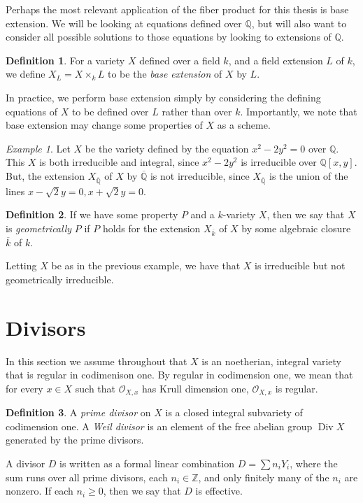 \documentclass[12pt,twoside]{reedthesis}
\theoremstyle{plain}
\theoremstyle{definition}
\newtheorem{definition}{Definition}[section]
\theoremstyle{remark}
\newtheorem{example}{Example}[section]
\newcommand{\ZZ}{\mathbb{Z}}
\newcommand{\QQ}{\mathbb{Q}}
\newcommand{\calO}{\mathcal{O}}
\newcommand{\Div}{\operatorname{Div}}
\begin{document}
Perhaps the most relevant application of the fiber product for this thesis is base extension. We will be looking at equations defined over $\QQ$, but will also want to consider all possible solutions to those equations by looking to extensions of $\QQ$.
\begin{definition}
For a variety $X$ defined over a field $k$, and a field extension $L$ of $k$, we define $X_L=X\times_k L$ to be the \emph{base extension} of $X$ by $L$.
\end{definition}
\noindent In practice, we perform base extension simply by considering the defining equations of $X$ to be defined over $L$ rather than over $k$. Importantly, we note that base extension may change some properties of $X$ as a scheme.

\begin{example}
Let $X$ be the variety defined by the equation $x^2-2y^2=0$ over $\QQ$. This $X$ is both irreducible and integral, since $x^2-2y^2$ is irreducible over $\QQ[x,y]$. But, the extension $X_{\overline{\QQ}}$ of $X$ by $\overline{\QQ}$ is not irreducible, since $X_{\overline{\QQ}}$ is the union of the lines $x-\sqrt{2}y=0, x+\sqrt{2}y=0$.
\end{example}

\begin{definition}
If we have some property $P$ and a $k$-variety $X$, then we say that $X$ is \emph{geometrically} $P$ if $P$ holds for the extension $X_{\overline{k}}$ of $X$ by some algebraic closure $\overline{k}$ of $k$.
\end{definition}
\noindent Letting $X$ be as in the previous example, we have that $X$ is irreducible but not geometrically irreducible.

\section{Divisors}
In this section we assume throughout that $X$ is an noetherian, integral variety that is regular in codimenison one. By regular in codimension one, we mean that for every $x\in X$ such that $\calO_{X,x}$ has Krull dimension one, $\calO_{X,x}$ is regular.

\begin{definition}
A \emph{prime divisor} on $X$ is a closed integral subvariety of codimension one. A \emph{Weil divisor} is an element of the free abelian group $\Div X$ generated by the prime divisors. 
\end{definition}
A divisor $D$ is written as a formal linear combination $D=\sum n_i Y_i$, where the sum runs over all prime divisors, each $n_i\in\ZZ$, and only finitely many of the $n_i$ are nonzero. If each $n_i\geq 0$, then we say that $D$ is effective.
\end{document}
